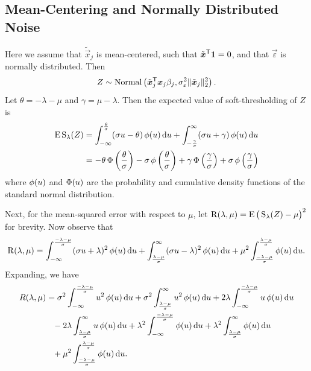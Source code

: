 \subsection{Mean-Centering and Normally Distributed Noise}

Here we assume that \(\tilde{\vec{x}}_j\) is mean-centered, such that \(\tilde{\boldsymbol{x}}^{\mathsf{T}} \boldsymbol{1} = 0\), and that \(\vec{\varepsilon}\) is normally distributed. Then
\[
  Z \sim \operatorname{Normal}\left(\tilde{\boldsymbol{x}}_j^{\mathsf{T}}\boldsymbol{x}_j \beta_j, \sigma_\varepsilon^2 \lVert \tilde{\boldsymbol{x}}_j\rVert_2^2 \right).
\]
Let \(\theta = -\lambda - \mu\) and \(\gamma = \mu - \lambda\). Then the expected value of soft-thresholding of \(Z\) is
\begin{align}
  \label{eq:mean-centered-eval}
  \operatorname{E} \operatorname{S}_\lambda(Z) & = \int_{-\infty}^\frac{\theta}{\sigma} (\sigma u - \theta) \operatorname{\phi}(u) \mathop{}\!\mathrm{d} u + \int_{-\frac{\gamma}{\sigma}}^\infty (\sigma u + \gamma) \operatorname{\phi}(u) \mathop{}\!\mathrm{d} u                                                \\
                    & = -\theta \operatorname{\Phi}\left(\frac{\theta}{\sigma}\right) - \sigma \operatorname{\phi}\left(\frac{\theta}{\sigma}\right) + \gamma \operatorname{\Phi}\left(\frac{\gamma}{\sigma}\right) + \sigma \operatorname{\phi}\left(\frac{\gamma}{\sigma}\right)
\end{align}
where \(\operatorname{\phi}(u)\) and \(\operatorname{\Phi}(u)\) are the probability and cumulative density functions of the standard normal distribution.

Next, for the mean-squared error with respect to \(\mu\), let \(\operatorname{R}(\lambda, \mu) = \operatorname{E} \big(\operatorname{S}_\lambda(Z) - \mu\big)^2\) for brevity. Now observe that
\[
  \operatorname{R}(\lambda, \mu) = \int_{-\infty}^\frac{-\lambda - \mu}{\sigma} (\sigma u + \lambda)^2 \operatorname{\phi}(u)\mathop{}\!\mathrm{d} u +
  \int_{\frac{\lambda - \mu}{\sigma}}^\infty (\sigma u - \lambda)^2 \operatorname{\phi}(u)\mathop{}\!\mathrm{d} u + \mu^2 \int_{\frac{-\lambda - \mu}{\sigma}}^{\frac{\lambda - \mu}{\sigma}} \operatorname{\phi}(u)\mathop{}\!\mathrm{d} u.
\]
Expanding, we have
\[
  \begin{aligned}
    R(\lambda,\mu) & = \sigma^2 \int_{-\infty}^\frac{-\lambda - \mu}{\sigma} u^2 \operatorname{\phi}(u)\mathop{}\!\mathrm{d} u + \sigma^2 \int_\frac{\lambda - \mu}{\sigma}^\infty u^2 \operatorname{\phi}(u)\mathop{}\!\mathrm{d} u + 2\lambda \int_{-\infty}^\frac{-\lambda - \mu}{\sigma} u \operatorname{\phi}(u)\mathop{}\!\mathrm{d} u \\
                   & \phantom{=} - 2\lambda \int_\frac{\lambda - \mu}{\sigma}^{\infty} u \operatorname{\phi}(u)\mathop{}\!\mathrm{d} u + \lambda^2 \int_{-\infty}^\frac{-\lambda-\mu}{\sigma} \operatorname{\phi}(u)\mathop{}\!\mathrm{d} u + \lambda^2 \int_\frac{\lambda-\mu}{\sigma}^\infty \operatorname{\phi}(u)\mathop{}\!\mathrm{d} u \\
                   & \phantom{=} + \mu^2 \int_\frac{-\lambda - \mu}{\sigma}^\frac{\lambda - \mu}{\sigma} \operatorname{\phi}(u) \mathop{}\!\mathrm{d} u.
  \end{aligned}
\]


